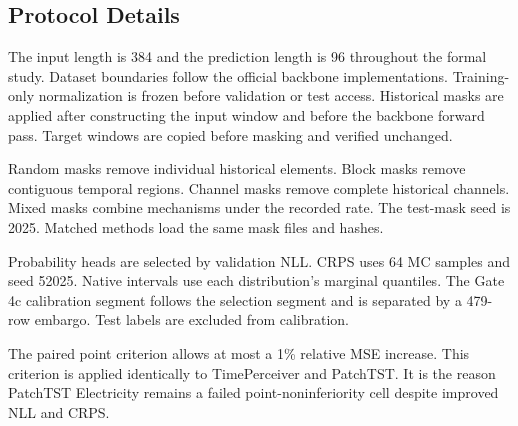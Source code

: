 \subsection{Protocol Details}
\label{app:protocol}

The input length is 384 and the prediction length is 96 throughout the formal study. Dataset boundaries follow the official backbone implementations. Training-only normalization is frozen before validation or test access. Historical masks are applied after constructing the input window and before the backbone forward pass. Target windows are copied before masking and verified unchanged.

Random masks remove individual historical elements. Block masks remove contiguous temporal regions. Channel masks remove complete historical channels. Mixed masks combine mechanisms under the recorded rate. The test-mask seed is 2025. Matched methods load the same mask files and hashes.

Probability heads are selected by validation NLL. CRPS uses 64 MC samples and seed 52025. Native intervals use each distribution's marginal quantiles. The Gate 4c calibration segment follows the selection segment and is separated by a 479-row embargo. Test labels are excluded from calibration.

The paired point criterion allows at most a 1\% relative MSE increase. This criterion is applied identically to TimePerceiver and PatchTST. It is the reason PatchTST Electricity remains a failed point-noninferiority cell despite improved NLL and CRPS.
